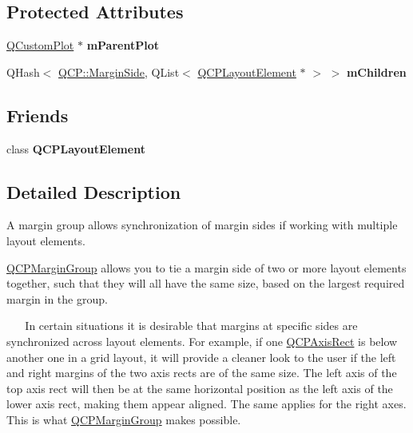 \subsection*{Protected Attributes}
\begin{DoxyCompactItemize}
\item 
\mbox{\label{classQCPMarginGroup_a23cfa29e3cc0f33a59141b77d8c04edf}} 
\hyperlink{classQCustomPlot}{Q\+Custom\+Plot} $\ast$ {\bfseries m\+Parent\+Plot}
\item 
\mbox{\label{classQCPMarginGroup_a954bc89ff8958b9bb6a4a0d08ed5fc0f}} 
Q\+Hash$<$ \hyperlink{namespaceQCP_a7e487e3e2ccb62ab7771065bab7cae54}{Q\+C\+P\+::\+Margin\+Side}, Q\+List$<$ \hyperlink{classQCPLayoutElement}{Q\+C\+P\+Layout\+Element} $\ast$ $>$ $>$ {\bfseries m\+Children}
\end{DoxyCompactItemize}
\subsection*{Friends}
\begin{DoxyCompactItemize}
\item 
\mbox{\label{classQCPMarginGroup_a0790750c7e7f14fdbd960d172655b42b}} 
class {\bfseries Q\+C\+P\+Layout\+Element}
\end{DoxyCompactItemize}


\subsection{Detailed Description}
A margin group allows synchronization of margin sides if working with multiple layout elements. 

\hyperlink{classQCPMarginGroup}{Q\+C\+P\+Margin\+Group} allows you to tie a margin side of two or more layout elements together, such that they will all have the same size, based on the largest required margin in the group.

~\newline
~\newline
 In certain situations it is desirable that margins at specific sides are synchronized across layout elements. For example, if one \hyperlink{classQCPAxisRect}{Q\+C\+P\+Axis\+Rect} is below another one in a grid layout, it will provide a cleaner look to the user if the left and right margins of the two axis rects are of the same size. The left axis of the top axis rect will then be at the same horizontal position as the left axis of the lower axis rect, making them appear aligned. The same applies for the right axes. This is what \hyperlink{classQCPMarginGroup}{Q\+C\+P\+Margin\+Group} makes possible.

